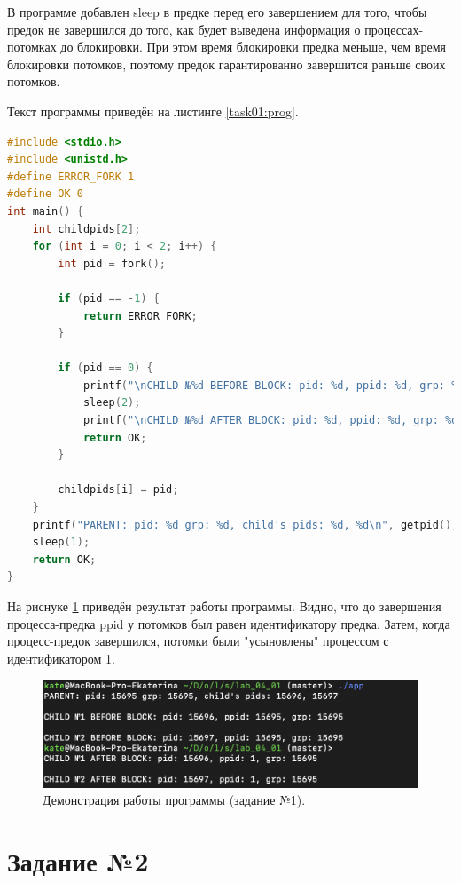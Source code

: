 \documentclass[12pt]{report}
\begin{document}
В программе добавлен sleep в предке перед его завершением для того, чтобы предок не завершился до того, как будет выведена информация о процессах-потомках до блокировки. При этом время блокировки предка меньше, чем время блокировки потомков, поэтому предок гарантированно завершится раньше своих потомков.

Текст программы приведён на листинге \ref{task01:prog}.

\begin{lstlisting}[label=task01:prog,caption=Процессы-сироты,language=C]
#include <stdio.h>
#include <unistd.h>
#define ERROR_FORK 1
#define OK 0
int main() {
    int childpids[2];
    for (int i = 0; i < 2; i++) {
        int pid = fork();

        if (pid == -1) {
            return ERROR_FORK;
        }

        if (pid == 0) {
            printf("\nCHILD №%d BEFORE BLOCK: pid: %d, ppid: %d, grp: %d\n", i + 1, getpid(), getppid(), getpgrp());
            sleep(2);
            printf("\nCHILD №%d AFTER BLOCK: pid: %d, ppid: %d, grp: %d\n", i + 1, getpid(), getppid(), getpgrp());
            return OK;
        }

        childpids[i] = pid;
    }
    printf("PARENT: pid: %d grp: %d, child's pids: %d, %d\n", getpid(), getpgrp(), childpids[0], childpids[1]);
    sleep(1);
    return OK;
}
\end{lstlisting}

На риснуке \ref{task01:demo} приведён результат работы программы. Видно, что до завершения процесса-предка ppid у потомков был равен идентификатору предка. Затем, когда процесс-предок завершился, потомки были "усыновлены" процессом с идентификатором 1.  
\begin{figure}[H]

	\centering

	\includegraphics[width=\linewidth]{task01.png}
	\caption{Демонстрация работы программы (задание №1).}

	\label{task01:demo}

\end{figure}
\newpage
\section*{Задание №2}
\end{document}
